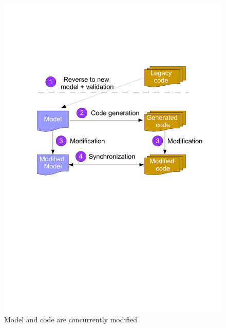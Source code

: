 \begin{figure}
\centering
\includegraphics[height = 0.20\textheight, trim = 90 370 60 170, clip]{figures/scenario3}
\caption{\label{fig:scenario3}Model and code are concurrently modified} 
\end{figure}